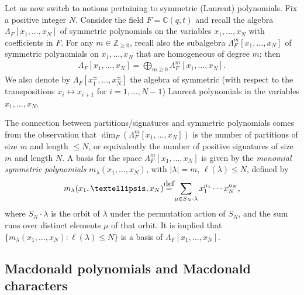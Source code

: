 \documentclass[11pt]{article}
\numberwithin{equation}{section}
\newcommand\myeq{\mathrel{\stackrel{\makebox[0pt]{\mbox{\normalfont\tiny def}}}{=}}}
\newcommand{\C}{\mathbb{C}}
\newcommand{\Z}{\mathbb{Z}}
\begin{document}
Let us now switch to notions pertaining to symmetric (Laurent) polynomials. Fix a positive integer $N$. Consider the f\/ield $F = \C(q, t)$ and recall the algebra $\Lambda_F[x_1, \dots, x_N]$ of symmetric polynomials on the variables $x_1, \dots, x_N$ with coef\/f\/icients in $F$. For any $m\in\Z_{\geq 0}$, recall also the subalgebra $\Lambda_F^m[x_1, \dots, x_N]$ of symmetric polynomials on $x_1, \dots, x_N$ that are homogeneous of degree $m$; then
\begin{gather*}
\Lambda_F[x_1, \dots, x_N] = \bigoplus_{m\geq 0}{\Lambda_F^m[x_1, \dots, x_N]}.
\end{gather*}
We also denote by $\Lambda_F[x_1^{\pm}, \dots, x_N^{\pm}]$ the algebra of symmetric (with respect to the transpositions $x_i \leftrightarrow x_{i+1}$ for $i = 1, \dots, N-1$) Laurent polynomials in the variables $x_1, \dots, x_N$.

The connection between partitions/signatures and symmetric polynomials comes from the observation that $\dim_F \left(\Lambda_F^m[x_1, \dots, x_N]\right)$ is the number of partitions of size $m$ and length $\leq N$, or equivalently the number of positive signatures of size $m$ and length $N$. A basis for the space $\Lambda_F^m[x_1, \dots, x_N]$ is given by the \textit{monomial symmetric polynomials} $m_{\lambda}(x_1, \dots, x_N)$, with $|\lambda| = m$, $\ell(\lambda)\leq N$, def\/ined by
\begin{gather*}
m_{\lambda}(x_1, \dots, x_N) \myeq \sum_{\mu\in S_N\cdot\lambda}{x_1^{\mu_1}\cdots x_N^{\mu_N}},
\end{gather*}
where $S_N\cdot\lambda$ is the orbit of $\lambda$ under the permutation action of $S_N$, and the sum runs over distinct elements $\mu$ of that orbit. It is implied that $\{m_{\lambda}(x_1, \dots, x_N)\colon \ell(\lambda) \leq N\}$ is a basis of $\Lambda_F[x_1, \dots, x_N]$.

\subsection{Macdonald polynomials and Macdonald characters}\label{macdonaldpolysection}
\end{document}

